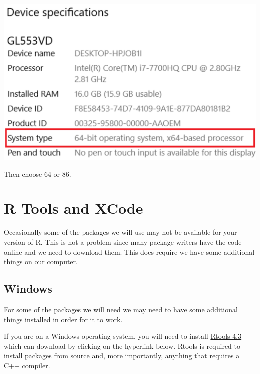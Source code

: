 \documentclass[
  letterpaper,
  DIV=11,
  numbers=noendperiod,
  oneside]{scrreprt}
\begin{document}
\includegraphics{figs/windows-machine.png}

Then choose 64 or 86.

\hypertarget{r-tools-and-xcode}{%
\section{R Tools and XCode}\label{r-tools-and-xcode}}

Occasionally some of the packages we will use may not be available for
your version of R. This is not a problem since many package writers have
the code online and we need to download them. This does require we have
some additional things on our computer.

\subsection{Windows}

\begin{tcolorbox}[enhanced jigsaw, breakable, opacitybacktitle=0.6, colframe=quarto-callout-warning-color-frame, bottomrule=.15mm, opacityback=0, toprule=.15mm, coltitle=black, toptitle=1mm, colback=white, titlerule=0mm, bottomtitle=1mm, colbacktitle=quarto-callout-warning-color!10!white, title=\textcolor{quarto-callout-warning-color}{\faExclamationTriangle}\hspace{0.5em}{Required Step}, rightrule=.15mm, arc=.35mm, leftrule=.75mm, left=2mm]

For some of the packages we will need we may need to have some
additional things installed in order for it to work.

\end{tcolorbox}

If you are on a Windows operating system, you will need to install
\href{https://cran.r-project.org/bin/windows/Rtools/rtools43/rtools.html}{Rtools
4.3} which can download by clicking on the hyperlink below. Rtools is
required to install packages from source and, more importantly, anything
that requires a C++ compiler.
\end{document}
